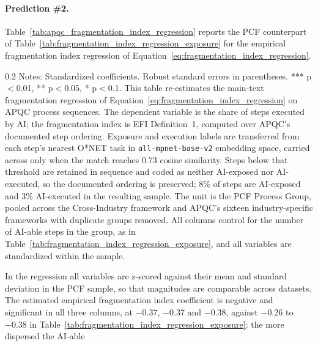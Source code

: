 \paragraph{Prediction \#2.}
Table~\ref{tab:apqc_fragmentation_index_regression} reports the PCF counterpart of Table~\ref{tab:fragmentation_index_regression_exposure} for the empirical fragmentation index regression of Equation~\eqref{eq:fragmentation_index_regression}.
\begin{table}[!t]
    \caption{Fragmentation and AI Execution on APQC's Documented Process Sequences}
    \label{tab:apqc_fragmentation_index_regression}
    \footnotesize
    \centering
    \begin{minipage}{1\linewidth}
\begin{spacing}{0.2}
{\fontsize{9.5pt}{10pt}\selectfont Notes: Standardized coefficients. Robust standard errors in parentheses. *** p$<$0.01, ** p$<$0.05, * p$<$0.1.
This table re-estimates the main-text fragmentation regression of Equation~\eqref{eq:fragmentation_index_regression} on APQC process sequences.
The dependent variable is the share of steps executed by AI; the fragmentation index is EFI Definition~1, computed over APQC's documented step ordering.
Exposure and execution labels are transferred from each step's nearest O*NET task in \texttt{all-mpnet-base-v2} embedding space, carried across only when the match reaches $0.73$ cosine similarity.
Steps below that threshold are retained in sequence and coded as neither AI-exposed nor AI-executed, so the documented ordering is preserved; $8\%$ of steps are AI-exposed and $3\%$ AI-executed in the resulting sample.
The unit is the PCF Process Group, pooled across the Cross-Industry framework and APQC's sixteen industry-specific frameworks with duplicate groups removed.
All columns control for the number of AI-able steps in the group, as in Table~\ref{tab:fragmentation_index_regression_exposure}, and all variables are standardized within the sample.}
\end{spacing}
\end{minipage}\end{table}
In the regression all variables are z-scored against their mean and standard deviation in the PCF sample, so that magnitudes are comparable across datasets.
The estimated empirical fragmentation index coefficient is negative and significant in all three columns, at $-0.37$, $-0.37$ and $-0.38$, against $-0.26$ to $-0.38$ in Table~\ref{tab:fragmentation_index_regression_exposure}: the more dispersed the AI-able
